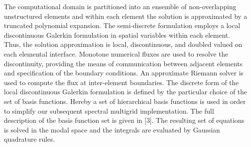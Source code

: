 \documentclass[twosided]{report}
\begin{document}
The computational domain is partitioned into an ensemble of
non-overlapping unstructured elements and within each element the
solution is approximated by a truncated polynomial expansion. The
semi-discrete formulation employs a local discontinuous Galerkin
formulation in spatial variables within each element. Thus, the
solution approximation is local, discontinuous, and doubled valued on
each elemental interface. Monotone numerical fluxes are used to resolve
the discontinuity, providing the means of communication between
adjacent elements and specification of the boundary conditions. An
approximate Riemann solver is used to compute the flux at inter-element
boundaries. The discrete form of the local discontinuous Galerkin
formulation is defined by the particular choice of the set of basis
functions. Hereby a set of hierarchical basis functions is used in
order to simplify our subsequent spectral multigrid implementation. The
full description of the basis function set is given in [3]. The
resulting set of equations is solved in the modal space and the
integrals are evaluated by Gaussian quadrature rules.
\end{document}
